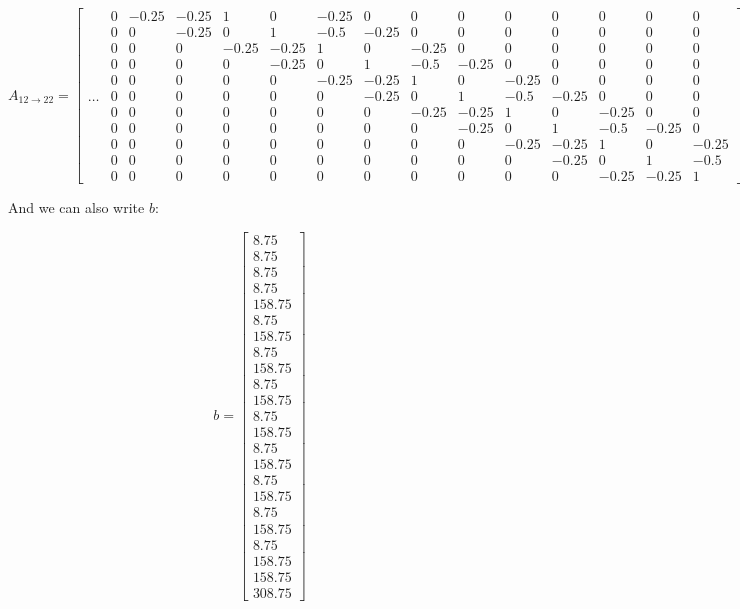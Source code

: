 \tiny
\[
A_{12 \rightarrow 22}=
  \begin{bmatrix}
     & 0     & -0.25 & -0.25 & 1     & 0     & -0.25 & 0     & 0     & 0     & 0     & 0     & 0     & 0     & 0     \\
     & 0     & 0     & -0.25 & 0     & 1     & -0.5  & -0.25 & 0     & 0     & 0     & 0     & 0     & 0     & 0     \\
     & 0     & 0     & 0     & -0.25 & -0.25 & 1     & 0     & -0.25 & 0     & 0     & 0     & 0     & 0     & 0     \\
     & 0     & 0     & 0     & 0     & -0.25 & 0     & 1     & -0.5  & -0.25 & 0     & 0     & 0     & 0     & 0     \\
     & 0     & 0     & 0     & 0     & 0     & -0.25 & -0.25 & 1     & 0     & -0.25 & 0     & 0     & 0     & 0     \\
 \dots    & 0     & 0     & 0     & 0     & 0     & 0     & -0.25 & 0     & 1     & -0.5  & -0.25 & 0     & 0     & 0     \\
     & 0     & 0     & 0     & 0     & 0     & 0     & 0     & -0.25 & -0.25 & 1     & 0     & -0.25 & 0     & 0     \\
     & 0     & 0     & 0     & 0     & 0     & 0     & 0     & 0     & -0.25 & 0     & 1     & -0.5  & -0.25 & 0     \\
     & 0     & 0     & 0     & 0     & 0     & 0     & 0     & 0     & 0     & -0.25 & -0.25 & 1     & 0     & -0.25 \\
     & 0     & 0     & 0     & 0     & 0     & 0     & 0     & 0     & 0     & 0     & -0.25 & 0     & 1     & -0.5  \\
     & 0     & 0     & 0     & 0     & 0     & 0     & 0     & 0     & 0     & 0     & 0     & -0.25 & -0.25 & 1        
  \end{bmatrix}
\]

\normalsize
And we can also write $b$:

\tiny
\[
b =
  \begin{bmatrix}
8.75 \\
8.75 \\
8.75 \\
8.75\\
158.75\\
8.75\\
158.75\\ 
8.75\\
158.75\\ 
8.75\\
158.75\\ 
8.75 \\
158.75 \\
8.75 \\
158.75\\
8.75 \\
158.75 \\
8.75 \\
158.75 \\
8.75\\
158.75\\ 
158.75 \\
308.75
   \end{bmatrix}
\]


